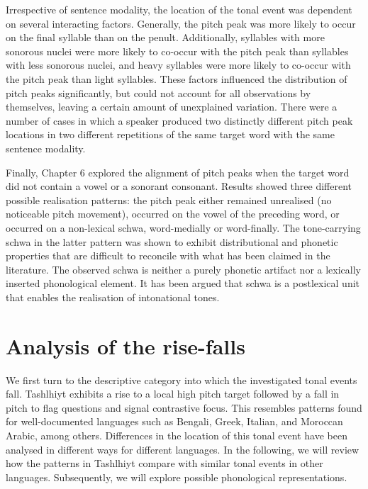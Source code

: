 Irrespective of sentence modality, the location of the tonal event was dependent on several interacting factors. Generally, the pitch peak was more likely to occur on the final syllable than on the penult. Additionally, syllables with more sonorous nuclei were more likely to co-occur with the pitch peak than syllables with less sonorous nuclei, and heavy syllables were more likely to co-occur with the pitch peak than light syllables. These factors influenced the distribution of pitch peaks significantly, but could not account for all observations by themselves, leaving a certain amount of unexplained variation. There were a number of cases in which a speaker produced two distinctly different pitch peak locations in two different repetitions of the same target word with the same sentence modality.

Finally, Chapter 6 explored the alignment of  pitch peaks when the target word did not contain a vowel or a sonorant consonant. Results showed three different possible realisation patterns: the pitch peak either remained unrealised (no noticeable pitch movement), occurred on the vowel of the preceding word, or occurred on a non-lexical schwa, word-medially or word-finally. The tone-carrying schwa in the latter pattern was shown to exhibit distributional and phonetic properties that are difficult to reconcile with what has been claimed in the literature. The observed schwa is neither a purely phonetic artifact nor a lexically inserted phonological element. It has been argued that schwa is a postlexical unit that enables the realisation of intonational tones.

\section{Analysis of the rise-falls}\label{sec:7.3}
We first turn to the descriptive category into which the investigated tonal events fall. Tashlhiyt exhibits a rise to a local high pitch target followed by a fall in pitch to flag questions and signal contrastive focus. This resembles patterns found for well-documented languages such as Bengali, Greek, Italian, and Moroccan Arabic, among others. Differences in the location of this tonal event have been analysed in different ways for different languages. In the following, we will review how the patterns in Tashlhiyt compare with similar tonal events in other languages. Subsequently, we will explore possible phonological representations.

